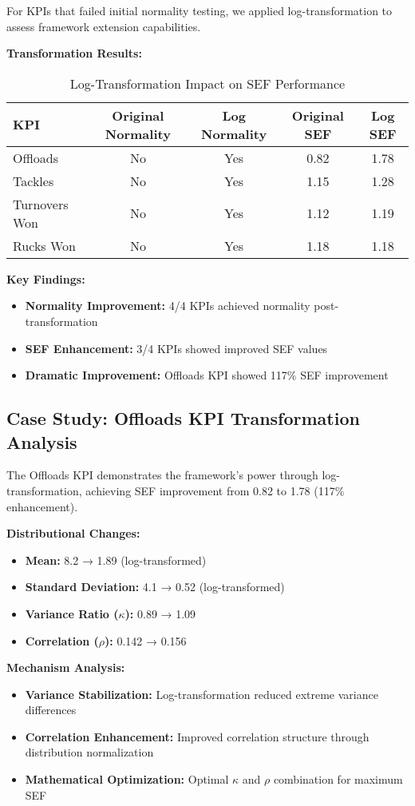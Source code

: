 For KPIs that failed initial normality testing, we applied log-transformation to assess framework extension capabilities.

\textbf{Transformation Results:}
\begin{table}[h]
\centering
\caption{Log-Transformation Impact on SEF Performance}
\begin{tabular}{lcccc}
\hline
\textbf{KPI} & \textbf{Original Normality} & \textbf{Log Normality} & \textbf{Original SEF} & \textbf{Log SEF} \\
\hline
Offloads & No & Yes & 0.82 & 1.78 \\
Tackles & No & Yes & 1.15 & 1.28 \\
Turnovers Won & No & Yes & 1.12 & 1.19 \\
Rucks Won & No & Yes & 1.18 & 1.18 \\
\hline
\end{tabular}
\end{table}

\textbf{Key Findings:}
\begin{itemize}
    \item \textbf{Normality Improvement:} 4/4 KPIs achieved normality post-transformation
    \item \textbf{SEF Enhancement:} 3/4 KPIs showed improved SEF values
    \item \textbf{Dramatic Improvement:} Offloads KPI showed 117\% SEF improvement
\end{itemize}

\subsection{Case Study: Offloads KPI Transformation Analysis}

The Offloads KPI demonstrates the framework's power through log-transformation, achieving SEF improvement from 0.82 to 1.78 (117\% enhancement).

\textbf{Distributional Changes:}
\begin{itemize}
    \item \textbf{Mean:} 8.2 → 1.89 (log-transformed)
    \item \textbf{Standard Deviation:} 4.1 → 0.52 (log-transformed)
    \item \textbf{Variance Ratio ($\kappa$):} 0.89 → 1.09
    \item \textbf{Correlation ($\rho$):} 0.142 → 0.156
\end{itemize}

\textbf{Mechanism Analysis:}
\begin{itemize}
    \item \textbf{Variance Stabilization:} Log-transformation reduced extreme variance differences
    \item \textbf{Correlation Enhancement:} Improved correlation structure through distribution normalization
    \item \textbf{Mathematical Optimization:} Optimal $\kappa$ and $\rho$ combination for maximum SEF
\end{itemize}

